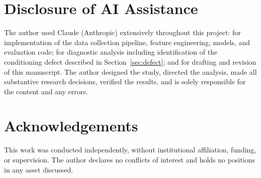 \documentclass[11pt]{article}
\begin{document}
\section*{Disclosure of AI Assistance}

The author used Claude (Anthropic) extensively throughout this project: for
implementation of the data collection pipeline, feature engineering, models, and
evaluation code; for diagnostic analysis including identification of the
conditioning defect described in Section~\ref{sec:defect}; and for drafting and
revision of this manuscript. The author designed the study, directed the
analysis, made all substantive research decisions, verified the results, and is
solely responsible for the content and any errors.

\section*{Acknowledgements}

This work was conducted independently, without institutional affiliation,
funding, or supervision. The author declares no conflicts of interest and holds
no positions in any asset discussed.


\end{document}
